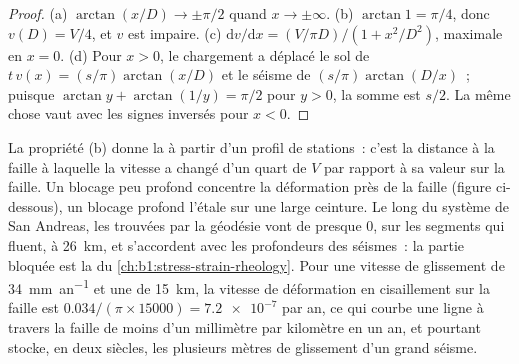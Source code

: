 \begin{proof}
(a) $\arctan(x/D) \to \pm\pi/2$ quand $x \to \pm\infty$. (b) $\arctan 1 = \pi/4$,
donc $v(D) = V/4$, et $v$ est impaire. (c) $\mathrm dv/\mathrm dx = (V/\pi D)/(1 +
x^2/D^2)$, maximale en $x = 0$. (d) Pour $x > 0$, le chargement a déplacé le
sol de $t\,v(x) = (s/\pi)\arctan(x/D)$ et le séisme de
$(s/\pi)\arctan(D/x)$~; puisque $\arctan y + \arctan(1/y) = \pi/2$ pour $y > 0$,
la somme est $s/2$. La même chose vaut avec les signes inversés pour $x < 0$.
\end{proof}

La propriété (b) donne la  à partir d'un profil de stations~: c'est la
distance à la faille à laquelle la vitesse a changé d'un quart de $V$
par rapport à sa valeur sur la faille. Un blocage peu profond concentre la déformation près de la
faille (figure ci-dessous), un blocage profond l'étale sur une large ceinture. Le long du système de
San Andreas, les  trouvées par la géodésie vont de presque 0, sur les
segments qui fluent, à \qty{26}{km}, et s'accordent avec les profondeurs des
séismes~: la partie bloquée est la  du
\cref{ch:b1:stress-strain-rheology}. Pour une vitesse de glissement de
\qty{34}{mm.an^{-1}} et une  de \qty{15}{km}, la vitesse de déformation en cisaillement
sur la faille est $\num{0.034}/(\pi\times\num{15000}) = \num{7.2e-7}$ par an,
ce qui courbe une ligne à travers la faille de moins d'un millimètre par kilomètre en
un an, et pourtant stocke, en deux siècles, les plusieurs mètres de glissement d'un grand
séisme.

